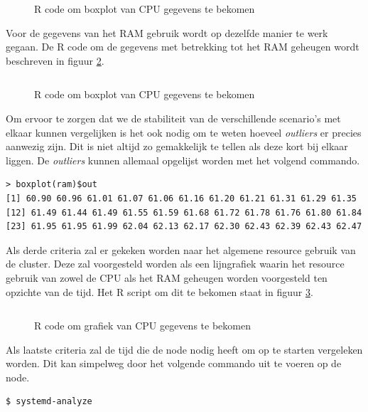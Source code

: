 \begin{figure}[h] 
	\inputminted[fontsize=\footnotesize,linenos]{R}{files/dataCpuBox.R}
	\caption{R code om boxplot van CPU gegevens te bekomen}
	\label{CPUBox}
\end{figure}
%

Voor de gegevens van het RAM gebruik wordt op dezelfde manier te werk gegaan. De R code om de gegevens met betrekking tot het RAM geheugen wordt beschreven in figuur \ref{RAMBox}.
\begin{figure}[h] 
	\inputminted[fontsize=\footnotesize,linenos]{R}{files/dataRAMBox.R}
	\caption{R code om boxplot van CPU gegevens te bekomen}
	\label{RAMBox}
\end{figure}

Om ervoor te zorgen dat we de stabiliteit van de verschillende scenario's  met elkaar kunnen vergelijken is het ook nodig om te weten hoeveel \textit{outliers} er precies aanwezig zijn. Dit is niet altijd zo gemakkelijk te tellen als deze kort bij elkaar liggen. De \textit{outliers} kunnen allemaal opgelijst worden met het volgend commando.
\begin{verbatim} 
> boxplot(ram)$out
[1] 60.90 60.96 61.01 61.07 61.06 61.16 61.20 61.21 61.31 61.29 61.35
[12] 61.49 61.44 61.49 61.55 61.59 61.68 61.72 61.78 61.76 61.80 61.84
[23] 61.95 61.95 61.99 62.04 62.13 62.17 62.30 62.43 62.39 62.43 62.47
\end{verbatim}

Als derde criteria zal er gekeken worden naar het algemene resource gebruik van de cluster. Deze zal voorgesteld worden als een lijngrafiek waarin het resource gebruik van zowel de CPU als het RAM geheugen worden voorgesteld ten opzichte van de tijd. Het R script om dit te bekomen staat in figuur \ref{CPUGraph}. 
\begin{figure}[h] 
	\inputminted[fontsize=\footnotesize,linenos]{R}{files/dataCpuGraph.R}
	\caption{R code om grafiek van CPU gegevens te bekomen}
	\label{CPUGraph}
\end{figure}

Als laatste criteria zal de tijd die de node nodig heeft om op te starten vergeleken worden. Dit kan simpelweg door het volgende commando uit te voeren op de node.
\begin{verbatim} 
$ systemd-analyze
\end{verbatim}

